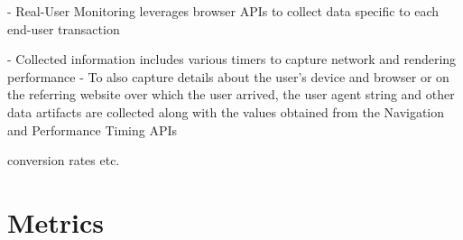- Real-User Monitoring leverages browser APIs to collect data specific to each end-user transaction

- Collected information includes various timers to capture network and rendering performance
- To also capture details about the user’s device and browser or on the referring website over which the user arrived, the user agent string and other data artifacts are collected along with the values obtained from the Navigation and Performance Timing APIs


conversion rates etc.











\section{Metrics}
















